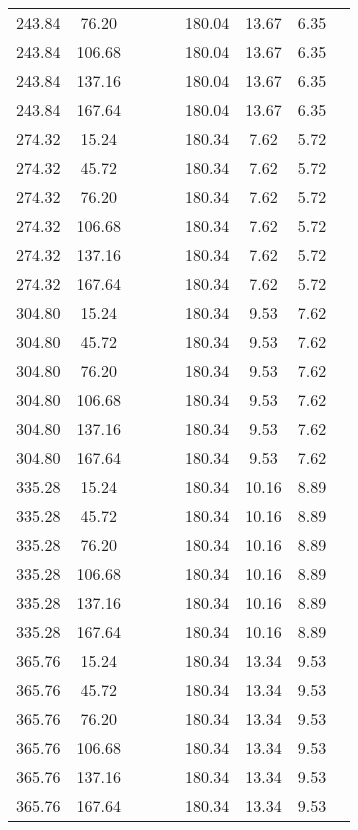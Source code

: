 \begin{center}
\begin{tabular}{| c | c | c | c | c | c | c | c | c |}
243.84 & 76.20 &  &  &  & 180.04 & 13.67 & 6.35 \\
243.84 & 106.68 &  &  &  & 180.04 & 13.67 & 6.35 \\
243.84 & 137.16 &  &  &  & 180.04 & 13.67 & 6.35 \\
243.84 & 167.64 &  &  &  & 180.04 & 13.67 & 6.35 \\
274.32 & 15.24 &  &  &  & 180.34 & 7.62 & 5.72 \\
274.32 & 45.72 &  &  &  & 180.34 & 7.62 & 5.72 \\
274.32 & 76.20 &  &  &  & 180.34 & 7.62 & 5.72 \\
274.32 & 106.68 &  &  &  & 180.34 & 7.62 & 5.72 \\
274.32 & 137.16 &  &  &  & 180.34 & 7.62 & 5.72 \\
274.32 & 167.64 &  &  &  & 180.34 & 7.62 & 5.72 \\
304.80 & 15.24 &  &  &  & 180.34 & 9.53 & 7.62 \\
304.80 & 45.72 &  &  &  & 180.34 & 9.53 & 7.62 \\
304.80 & 76.20 &  &  &  & 180.34 & 9.53 & 7.62 \\
304.80 & 106.68 &  &  &  & 180.34 & 9.53 & 7.62 \\
304.80 & 137.16 &  &  &  & 180.34 & 9.53 & 7.62 \\
304.80 & 167.64 &  &  &  & 180.34 & 9.53 & 7.62 \\
335.28 & 15.24 &  &  &  & 180.34 & 10.16 & 8.89 \\
335.28 & 45.72 &  &  &  & 180.34 & 10.16 & 8.89 \\
335.28 & 76.20 &  &  &  & 180.34 & 10.16 & 8.89 \\
335.28 & 106.68 &  &  &  & 180.34 & 10.16 & 8.89 \\
335.28 & 137.16 &  &  &  & 180.34 & 10.16 & 8.89 \\
335.28 & 167.64 &  &  &  & 180.34 & 10.16 & 8.89 \\
365.76 & 15.24 &  &  &  & 180.34 & 13.34 & 9.53 \\
365.76 & 45.72 &  &  &  & 180.34 & 13.34 & 9.53 \\
365.76 & 76.20 &  &  &  & 180.34 & 13.34 & 9.53 \\
365.76 & 106.68 &  &  &  & 180.34 & 13.34 & 9.53 \\
365.76 & 137.16 &  &  &  & 180.34 & 13.34 & 9.53 \\
365.76 & 167.64 &  &  &  & 180.34 & 13.34 & 9.53 \\
\hline
\end{tabular}
\end{center}